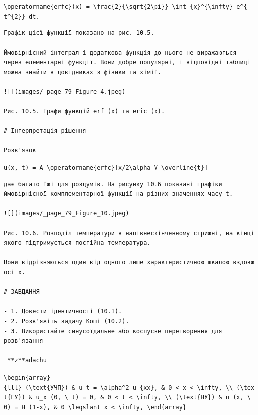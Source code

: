 \documentclass[
  ukrainian,
]{article}
\begin{document}
\texttt{\textbackslash{}operatorname\{erfc\}(x)\ =\ \textbackslash{}frac\{2\}\{\textbackslash{}sqrt\{2\textbackslash{}pi\}\}\ \textbackslash{}int\_\{x\}\^{}\{\textbackslash{}infty\}\ e\^{}\{-t\^{}\{2\}\}\ dt.}

\begin{verbatim}
Графік цієї функції показано на рис. 10.5.

Ймовірнісний інтеграл і додаткова функція до нього не виражаються через елементарні функції. Вони добре популярні, і відповідні таблиці можна знайти в довідниках з фізики та хімії.

![](images/_page_79_Figure_4.jpeg)

Рис. 10.5. Графи функцій erf (x) та eric (x).

# Інтерпретація рішення

Розв'язок
\end{verbatim}

\texttt{u(x,\ t)\ =\ A\ \textbackslash{}operatorname\{erfc\}{[}x/2\textbackslash{}alpha\ V\ \textbackslash{}overline\{t\}{]}}

\begin{verbatim}
дає багато їжі для роздумів. На рисунку 10.6 показані графіки ймовірнісної комплементарної функції на різних значеннях часу t.

![](images/_page_79_Figure_10.jpeg)

Рис. 10.6. Розподіл температури в напівнескінченному стрижні, на кінці якого підтримується постійна температура.

Вони відрізняються один від одного лише характеристичною шкалою вздовж осі x.

# ЗАВДАННЯ

- 1. Довести ідентичності (10.1).
- 2. Розв'яжіть задачу Коші (10.2).
- 3. Використайте синусоїдальне або коспусне перетворення для розв'язання

 **z**adachu
\end{verbatim}

\texttt{\textbackslash{}begin\{array\}\{lll\}\ (\textbackslash{}text\{УЧП\})\ \&\ u\_t\ =\ \textbackslash{}alpha\^{}2\ u\_\{xx\},\ \&\ 0\ \textless{}\ x\ \textless{}\ \textbackslash{}infty,\ \textbackslash{}\textbackslash{}\ (\textbackslash{}text\{ГУ\})\ \&\ u\_x\ (0,\ \textbackslash{}\ t)\ =\ 0,\ \&\ 0\ \textless{}\ t\ \textless{}\ \textbackslash{}infty,\ \textbackslash{}\textbackslash{}\ (\textbackslash{}text\{НУ\})\ \&\ u\ (x,\ \textbackslash{}\ 0)\ =\ H\ (1-x),\ \&\ 0\ \textbackslash{}leqslant\ x\ \textless{}\ \textbackslash{}infty,\ \textbackslash{}end\{array\}}
\end{document}
